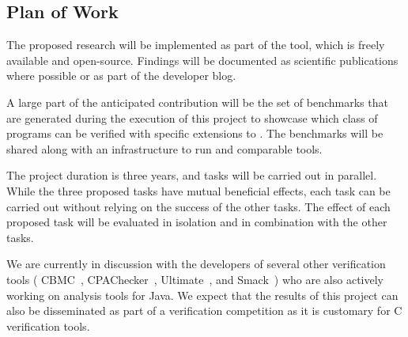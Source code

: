 \subsection{Plan of Work} %
\label{sec-impl}
The proposed research will be implemented as part of the \jayhorn tool,
which is freely available and open-source. Findings will be documented
as scientific publications where possible or as part of the \jayhorn
developer blog. 

A large part of the anticipated contribution will be the set of
benchmarks that are generated during the execution of this project to 
showcase which class of programs can be verified with specific extensions
to \jayhorn. The benchmarks will be shared along with an infrastructure
to run \jayhorn and comparable tools.

The project duration is three years, and tasks will be carried out in parallel.
While the three proposed tasks have mutual beneficial effects, each task can
be carried out without relying on the success of the other tasks. 
The effect of each proposed task will be evaluated in isolation and in 
combination with the other tasks. 

We are currently in discussion with the developers of several other 
verification tools (
CBMC~\cite{DBLP:conf/tacas/KroeningT14}, CPAChecker~\cite{Beyer:2011:CTC:2032305.2032321}, Ultimate~\cite{heizmann2015ultimate}, and Smack~\cite{cav2014-re}) who
are also actively working on analysis tools for Java. We expect
that the results of this project can also be disseminated as part of a verification
competition as it is customary for C verification tools. 